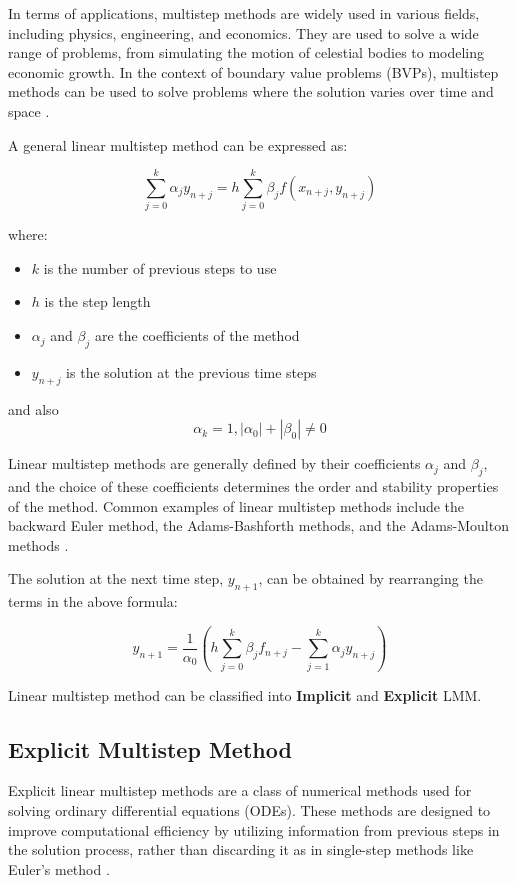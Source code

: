 In terms of applications, multistep methods are widely used in various fields, including physics, engineering, and economics. They are used to solve a wide range of problems, from simulating the motion of celestial bodies to modeling economic growth. In the context of boundary value problems (BVPs), multistep methods can be used to solve problems where the solution varies over time and space \cite{math7121158}.

A general linear multistep method can be expressed as:

\begin{equation}
\sum_{j=0}^{k} \alpha_j y_{n+j} = h \sum_{j=0}^{k} \beta_j f(x_{n+j}, y_{n+j})
\end{equation}

where:


\begin{itemize}
  \item \(k\) is the number of previous steps to use
  \item \(h\) is the step length
  \item \(\alpha_j\) and \(\beta_j\) are the coefficients of the method
  \item \(y_{n+j}\) is the solution at the previous time steps
\end{itemize}


and also \[\alpha_k = 1, |\alpha_0| +| \beta_0 | \neq 0 \]

Linear multistep methods are generally defined by their coefficients \(\alpha_j\) and \(\beta_j\), and the choice of these coefficients determines the order and stability properties of the method. Common examples of linear multistep methods include the backward Euler method, the Adams-Bashforth methods, and the Adams-Moulton methods \cite{lambert1977}.


The solution at the next time step, \(y_{n+1}\), can be obtained by rearranging the terms in the above formula:


\begin{equation}
  y_{n+1} = \frac{1}{\alpha_0} \left(h \sum_{j=0}^{k} \beta_j f_{n+j} - \sum_{j=1}^{k} \alpha_j y_{n+j}\right)
\end{equation}


Linear multistep method can be classified into \textbf{Implicit} and \textbf{Explicit} LMM.


\subsection{Explicit Multistep Method}
Explicit linear multistep methods are a class of numerical methods used for solving ordinary differential equations (ODEs). These methods are designed to improve computational efficiency by utilizing information from previous steps in the solution process, rather than discarding it as in single-step methods like Euler's method \cite{enwiki:1182900519}.

